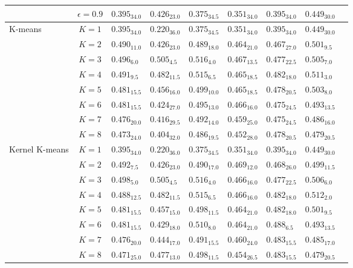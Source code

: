 \begin{table}[!t]
\begin{tabular}{l|c|lllllll}
 & $\epsilon=0.9$ & $0.395_{34.0}$ & $0.426_{23.0}$ & $0.375_{34.5}$ & $0.351_{34.0}$ & $0.395_{34.0}$ & $0.449_{30.0}$ \\
\midrule
\multirow[t]{8}{*}{K-means} & $K=1$ & $0.395_{34.0}$ & $0.220_{36.0}$ & $0.375_{34.5}$ & $0.351_{34.0}$ & $0.395_{34.0}$ & $0.449_{30.0}$ \\
 & $K=2$ & $0.490_{11.0}$ & $0.426_{23.0}$ & $0.489_{18.0}$ & $0.464_{21.0}$ & $0.467_{27.0}$ & $0.501_{9.5}$ \\
 & $K=3$ & $0.496_{6.0}$ & $\mathbf{0.505_{4.5}}$ & $0.516_{4.0}$ & $0.467_{13.5}$ & $0.477_{22.5}$ & $0.505_{7.0}$ \\
 & $K=4$ & $0.491_{9.5}$ & $0.482_{11.5}$ & $0.515_{6.5}$ & $0.465_{18.5}$ & $0.482_{18.0}$ & $0.511_{3.0}$ \\
 & $K=5$ & $0.481_{15.5}$ & $0.456_{16.0}$ & $0.499_{10.0}$ & $0.465_{18.5}$ & $0.478_{20.5}$ & $0.503_{8.0}$ \\
 & $K=6$ & $0.481_{15.5}$ & $0.424_{27.0}$ & $0.495_{13.0}$ & $0.466_{16.0}$ & $0.475_{24.5}$ & $0.493_{13.5}$ \\
 & $K=7$ & $0.476_{20.0}$ & $0.416_{29.5}$ & $0.492_{14.0}$ & $0.459_{25.0}$ & $0.475_{24.5}$ & $0.486_{16.0}$ \\
 & $K=8$ & $0.473_{24.0}$ & $0.404_{32.0}$ & $0.486_{19.5}$ & $0.452_{28.0}$ & $0.478_{20.5}$ & $0.479_{20.5}$ \\
\midrule
\multirow[t]{8}{*}{Kernel K-means} & $K=1$ & $0.395_{34.0}$ & $0.220_{36.0}$ & $0.375_{34.5}$ & $0.351_{34.0}$ & $0.395_{34.0}$ & $0.449_{30.0}$ \\
 & $K=2$ & $0.492_{7.5}$ & $0.426_{23.0}$ & $0.490_{17.0}$ & $0.469_{12.0}$ & $0.468_{26.0}$ & $0.499_{11.5}$ \\
 & $K=3$ & $0.498_{5.0}$ & $\mathbf{0.505_{4.5}}$ & $0.516_{4.0}$ & $0.466_{16.0}$ & $0.477_{22.5}$ & $0.506_{6.0}$ \\
 & $K=4$ & $0.488_{12.5}$ & $0.482_{11.5}$ & $0.515_{6.5}$ & $0.466_{16.0}$ & $0.482_{18.0}$ & $\mathbf{0.512_{2.0}}$ \\
 & $K=5$ & $0.481_{15.5}$ & $0.457_{15.0}$ & $0.498_{11.5}$ & $0.464_{21.0}$ & $0.482_{18.0}$ & $0.501_{9.5}$ \\
 & $K=6$ & $0.481_{15.5}$ & $0.429_{18.0}$ & $0.510_{8.0}$ & $0.464_{21.0}$ & $0.488_{6.5}$ & $0.493_{13.5}$ \\
 & $K=7$ & $0.476_{20.0}$ & $0.444_{17.0}$ & $0.491_{15.5}$ & $0.460_{24.0}$ & $0.483_{15.5}$ & $0.485_{17.0}$ \\
 & $K=8$ & $0.471_{25.0}$ & $0.477_{13.0}$ & $0.498_{11.5}$ & $0.454_{26.5}$ & $0.483_{15.5}$ & $0.479_{20.5}$ \\

\end{tabular}
\end{table}
